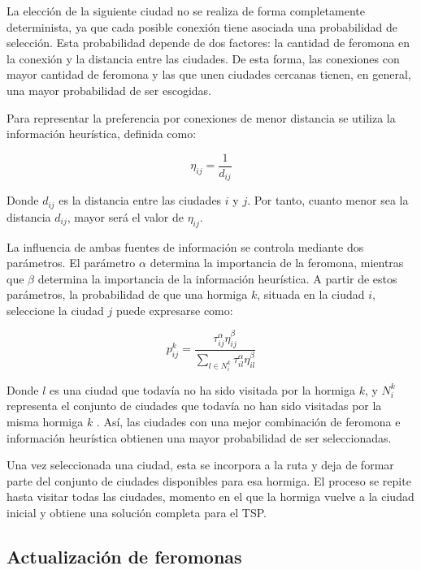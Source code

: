 La elección de la siguiente ciudad no se realiza de forma completamente determinista, ya que cada posible conexión tiene
asociada una probabilidad de selección. Esta probabilidad depende de dos factores: la cantidad de feromona en la conexión
y la distancia entre las ciudades. De esta forma, las conexiones con mayor cantidad de feromona y las que unen ciudades
cercanas tienen, en general, una mayor probabilidad de ser escogidas.

Para representar la preferencia por conexiones de menor distancia se utiliza la información heurística, definida como:

\begin{equation}
  \eta_{ij} = \frac{1}{d_{ij}}
\end{equation}

Donde $d_{ij}$ es la distancia entre las ciudades $i$ y $j$. Por tanto, cuanto menor sea la distancia $d_{ij}$, mayor
será el valor de $\eta_{ij}$.

La influencia de ambas fuentes de información se controla mediante dos parámetros. El parámetro $\alpha$ determina la 
importancia de la feromona, mientras que $\beta$ determina la importancia de la información heurística. A partir de 
estos parámetros, la probabilidad de que una hormiga $k$, situada en la ciudad $i$, seleccione la ciudad $j$ puede
expresarse como:

\begin{equation}
  p_{ij}^{k} = \frac{\tau_{ij}^{\alpha}\eta_{ij}^{\beta}}
  {\displaystyle\sum_{l\in N_i^k}\tau_{il}^{\alpha}\eta_{il}^{\beta}}
\end{equation}

Donde $l$ es una ciudad que todavía no ha sido visitada por la hormiga $k$, y $N_i^k$ representa el conjunto de ciudades 
que todavía no han sido visitadas por la misma hormiga $k$ \cite{dorigo2006}. Así, las ciudades con una mejor combinación 
de feromona e información heurística obtienen una mayor probabilidad de ser seleccionadas.

Una vez seleccionada una ciudad, esta se incorpora a la ruta y deja de formar parte del conjunto de ciudades disponibles
para esa hormiga. El proceso se repite hasta visitar todas las ciudades, momento en el que la hormiga vuelve a la 
ciudad inicial y obtiene una solución completa para el TSP.

\subsection{Actualización de feromonas}
\label{subsec:aco_fupdate}

